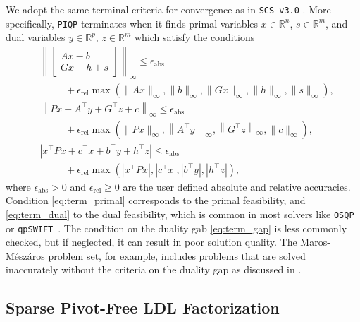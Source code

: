 \documentclass[letterpaper, 10 pt, conference]{ieeeconf}  \IEEEoverridecommandlockouts
\begin{document}
We adopt the same terminal criteria for convergence as in \texttt{SCS v3.0} \cite{donoghue2021}. More specifically, \texttt{PIQP} terminates when it finds primal variables $x\in \mathbb{R}^n$, $s \in \mathbb{R}^m$, and dual variables $y \in \mathbb{R}^p$, $z \in \mathbb{R}^m$ which satisfy the conditions
\begin{subequations}
\begin{align}
&\left\|\begin{bmatrix} Ax - b \\ Gx - h + s \end{bmatrix}\right\|_{\infty} \leq \epsilon_{\mathrm{abs}} \label{eq:term_primal} \\
& \;\;\qquad +\epsilon_{\mathrm{rel}} \max \left(\|A x\|_{\infty},\|b\|_{\infty},\|Gx\|_{\infty},\|h\|_{\infty},\|s\|_{\infty}\right), \nonumber \\[0.12cm]
&\left\|P x+A^\top y + G^\top z +c\right\|_{\infty} \leq \epsilon_{\mathrm{abs}} \label{eq:term_dual} \\
& \;\;\qquad +\epsilon_{\mathrm{rel}} \max \left(\|P x\|_{\infty}, \left\|A^\top y\right\|_{\infty},\left\|G^\top z\right\|_{\infty},\|c\|_{\infty}\right), \nonumber \\[0.12cm]
&\left|x^\top P x+c^\top x+b^\top y + h^\top z\right| \leq \epsilon_{\mathrm{abs}} \label{eq:term_gap} \\
& \;\;\qquad +\epsilon_{\mathrm{rel}} \max \left(\left|x^\top P x\right|,\left|c^\top x\right|,\left|b^\top y\right|,\left|h^\top z\right|\right), \nonumber
\end{align}
\end{subequations}
where $\epsilon_{\mathrm{abs}} > 0$ and $\epsilon_{\mathrm{rel}} \geq 0$ are the user defined absolute and relative accuracies. Condition \eqref{eq:term_primal} corresponds to the primal feasibility, and \eqref{eq:term_dual} to the dual feasibility, which is common in most solvers like \texttt{OSQP}~\cite{stellato2020} or \texttt{qpSWIFT}~\cite{pandala2019}. The condition on the duality gab \eqref{eq:term_gap} is less commonly checked, but if neglected, it can result in poor solution quality. The Maros-Mészáros problem set, for example, includes problems that are solved inaccurately without the criteria on the duality gap as discussed in \cite[Section~7.2]{donoghue2021}.

\subsection{Sparse Pivot-Free LDL Factorization} \label{subsec:factorization}
\end{document}

